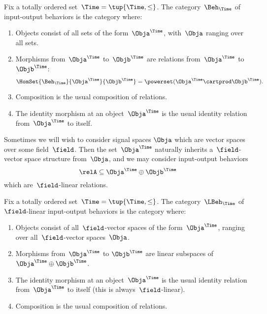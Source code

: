 \begin{definition}
    Fix a totally ordered set~$\Time = \tup{\Time, \leq}$.
    The category~$\Beh_\Time$ of input-output behaviors is the category where:
    \begin{enumerate}
        \item Objects consist of all sets of the form~$\Obja^\Time$, with~$\Obja$ ranging over all sets.
        \item Morphisms from~$\Obja^\Time$ to~$\Objb^\Time$ are relations from~$\Obja^\Time$ to~$\Objb^\Time$:
              \begin{equation}
                  \HomSet{\Beh_\Time}{\Obja^\Time}{\Objb^\Time} = \powerset (\Obja^\Time \cartprod \Objb^\Time).
              \end{equation}
        \item Composition is the usual composition of relations.
        \item The identity morphism at an object~$\Obja^\Time$ is the usual identity relation from~$\Obja^\Time$ to itself.
    \end{enumerate}
\end{definition}

Sometimes we will wish to consider signal spaces $\Obja$ which are vector spaces over some field~$\field$.
Then the set~$\Obja^\Time$ naturally inherits a~$\field$-vector space structure from~$\Obja$, and we may consider input-output behaviors
\begin{equation*}
    \relA \subseteq \Obja^\Time \oplus \Objb^\Time
\end{equation*}
which are~$\field$-linear relations.

\begin{definition}
    Fix a totally ordered set~$\Time = \tup{\Time, \leq}$.
    The category~$\LBeh_\Time$ of~$\field$-linear input-output behaviors is the category where:
    \begin{enumerate}
        \item Objects consist of all~$\field$-vector spaces of the form~$\Obja^\Time$, ranging over all~$\field$-vector spaces~$\Obja$.
        \item Morphisms from~$\Obja^\Time$ to $\Objb^\Time$ are linear subspaces of~$\Obja^\Time \oplus \Objb^\Time$.
        \item The identity morphism at an object~$\Obja^\Time$ is the usual identity relation from~$\Obja^\Time$ to itself (this is always~$\field$-linear).
        \item Composition is the usual composition of relations.
    \end{enumerate}
\end{definition}

